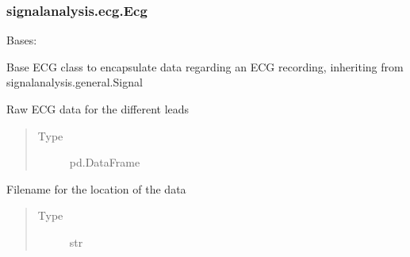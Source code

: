 \documentclass[letterpaper,10pt,english]{sphinxmanual}
\begin{document}
\subsubsection{signalanalysis.ecg.Ecg}
\label{\detokenize{_autosummary/signalanalysis.ecg.Ecg:signalanalysis-ecg-ecg}}\label{\detokenize{_autosummary/signalanalysis.ecg.Ecg::doc}}

\begin{fulllineitems}
\label{\detokenize{_autosummary/signalanalysis.ecg.Ecg:signalanalysis.ecg.Ecg}}
\sphinxAtStartPar
Bases: {\hyperref[\detokenize{_autosummary/signalanalysis.general.Signal:signalanalysis.general.Signal}]{}}

\sphinxAtStartPar
Base ECG class to encapsulate data regarding an ECG recording, inheriting from signalanalysis.general.Signal

\begin{fulllineitems}
\label{\detokenize{_autosummary/signalanalysis.ecg.Ecg:signalanalysis.ecg.Ecg.data}}
\sphinxAtStartPar
Raw ECG data for the different leads
\begin{quote}\begin{description}
\item[{Type}] \leavevmode
\sphinxAtStartPar
pd.DataFrame

\end{description}\end{quote}

\end{fulllineitems}


\begin{fulllineitems}
\label{\detokenize{_autosummary/signalanalysis.ecg.Ecg:signalanalysis.ecg.Ecg.filename}}
\sphinxAtStartPar
Filename for the location of the data
\begin{quote}\begin{description}
\item[{Type}] \leavevmode
\sphinxAtStartPar
str


\end{description}
\end{quote}
\end{fulllineitems}
\end{fulllineitems}
\end{document}
